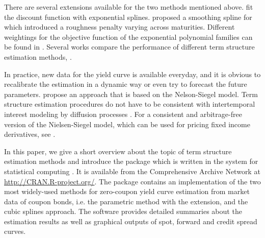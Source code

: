 There are several extensions available for the two methods mentioned above. \cite{Vasicek1982} fit the discount function with exponential splines. \cite{Fisher1995} proposed a smoothing spline for which \cite{Waggoner1997} introduced a roughness penalty varying across maturities. Different weightings for the objective function of the exponential polynomial families can be found in \cite{Soederlind1997}. Several works compare the performance of different term structure estimation methods, \citep[see e.g.][]{Bliss1997, Bolder1999, Ioannides2003}.

In practice, new data for the yield curve is available everyday, and it is obvious to recalibrate the estimation in a dynamic way or even try to forecast the future parameters. \cite{Diebold2006} propose an approach that is based on the Nelson-Siegel model. Term structure estimation procedures do not have to be consistent with intertemporal interest modeling by diffusion processes \citep[see, e.g.][]{Bjoerk1999, Filipovic1999}. For a consistent and arbitrage-free version of the Nielsen-Siegel model, which can be used for pricing fixed income derivatives, see \cite{Krippner2006}.   

In this paper, we give a short overview about the topic of term structure estimation methods and introduce the package  which is written in the  system for statistical computing \citep{R2008}. It is available from the Comprehensive  Archive Network at \url{http://CRAN.R-project.org/}. The package contains an implementation of the two most widely-used methods for zero-coupon yield curve estimation from market data of coupon bonds, i.e. the parametric \cite{Nelson1987} method with the \cite{Svensson1994} extension, and the \cite{McCulloch1975} cubic splines approach. The software provides detailed summaries about the estimation results as well as graphical outputs of spot, forward and credit spread curves.



